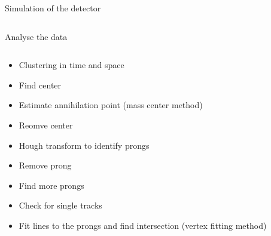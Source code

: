 \documentclass{beamer}
\begin{document}
\begin{frame}{\centering Simulation of the detector}
\begin{columns}
\begin{column}{0.55\textwidth}
    \end{column}
    \end{columns}
\end{frame}



\begin{frame}{\centering Analyse the data}
  \begin{columns}
    \begin{column}{0.5\textwidth}
      \begin{itemize}
      \item<1->{Clustering in time and space}
      \item<2->{Find center}
      \item<3->{Estimate annihilation point (mass center method)}
      \item<4->{Reomve center}
      \item<5->{Hough transform to identify prongs}
      \item<6->{Remove prong}
      \item<7->{Find more prongs}
      \item<8->{Check for single tracks}
      \item<11>{Fit lines to the prongs and find intersection (vertex fitting method)}
      \end{itemize}
    \end{column}
    \begin{column}{0.55\textwidth}
\end{column}
\end{columns}
\end{frame}
\end{document}
